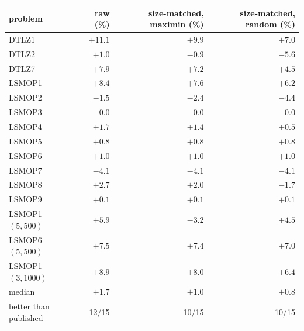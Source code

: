 \footnotesize
\setlength{\tabcolsep}{6pt}
\begin{tabular}{lrrr}
\toprule
problem & raw (\%) & size-matched, maximin (\%) & size-matched, random (\%) \\
\midrule
DTLZ1 & $+11.1$ & $+9.9$ & $+7.0$ \\
DTLZ2 & $+1.0$ & $-0.9$ & $-5.6$ \\
DTLZ7 & $+7.9$ & $+7.2$ & $+4.5$ \\
LSMOP1 & $+8.4$ & $+7.6$ & $+6.2$ \\
LSMOP2 & $-1.5$ & $-2.4$ & $-4.4$ \\
LSMOP3 & $0.0$ & $0.0$ & $0.0$ \\
LSMOP4 & $+1.7$ & $+1.4$ & $+0.5$ \\
LSMOP5 & $+0.8$ & $+0.8$ & $+0.8$ \\
LSMOP6 & $+1.0$ & $+1.0$ & $+1.0$ \\
LSMOP7 & $-4.1$ & $-4.1$ & $-4.1$ \\
LSMOP8 & $+2.7$ & $+2.0$ & $-1.7$ \\
LSMOP9 & $+0.1$ & $+0.1$ & $+0.1$ \\
LSMOP1 $(5,500)$ & $+5.9$ & $-3.2$ & $+4.5$ \\
LSMOP6 $(5,500)$ & $+7.5$ & $+7.4$ & $+7.0$ \\
LSMOP1 $(3,1000)$ & $+8.9$ & $+8.0$ & $+6.4$ \\
\midrule
median & $+1.7$ & $+1.0$ & $+0.8$ \\
better than published & 12/15 & 10/15 & 10/15 \\
\bottomrule
\end{tabular}
